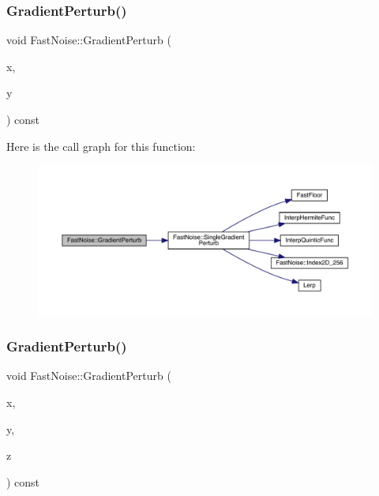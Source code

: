 \subsubsection{\texorpdfstring{Gradient\+Perturb()}{GradientPerturb()}\hspace{0.1cm}{\footnotesize\ttfamily [1/2]}}
{\footnotesize\ttfamily void Fast\+Noise\+::\+Gradient\+Perturb (\begin{DoxyParamCaption}\item[{\mbox{\hyperlink{_fast_noise_8h_a75a9ef6d2541c4921815b885bfd449c3}{F\+N\+\_\+\+D\+E\+C\+I\+M\+AL}} \&}]{x,  }\item[{\mbox{\hyperlink{_fast_noise_8h_a75a9ef6d2541c4921815b885bfd449c3}{F\+N\+\_\+\+D\+E\+C\+I\+M\+AL}} \&}]{y }\end{DoxyParamCaption}) const}

Here is the call graph for this function\+:
\nopagebreak
\begin{figure}[H]
\begin{center}
\leavevmode
\includegraphics[width=350pt]{class_fast_noise_a84d51e4e3c6abb7897954a4e77194e03_cgraph}
\end{center}
\end{figure}
\mbox{\label{class_fast_noise_a24007877680a6d0f45ea1d7f209ee6f1}} 
\subsubsection{\texorpdfstring{Gradient\+Perturb()}{GradientPerturb()}\hspace{0.1cm}{\footnotesize\ttfamily [2/2]}}
{\footnotesize\ttfamily void Fast\+Noise\+::\+Gradient\+Perturb (\begin{DoxyParamCaption}\item[{\mbox{\hyperlink{_fast_noise_8h_a75a9ef6d2541c4921815b885bfd449c3}{F\+N\+\_\+\+D\+E\+C\+I\+M\+AL}} \&}]{x,  }\item[{\mbox{\hyperlink{_fast_noise_8h_a75a9ef6d2541c4921815b885bfd449c3}{F\+N\+\_\+\+D\+E\+C\+I\+M\+AL}} \&}]{y,  }\item[{\mbox{\hyperlink{_fast_noise_8h_a75a9ef6d2541c4921815b885bfd449c3}{F\+N\+\_\+\+D\+E\+C\+I\+M\+AL}} \&}]{z }\end{DoxyParamCaption}) const}

